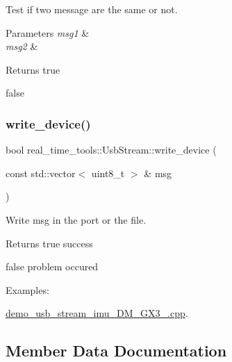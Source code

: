 Test if two message are the same or not. 


\begin{DoxyParams}{Parameters}
{\em msg1} & \\
\hline
{\em msg2} & \\
\hline
\end{DoxyParams}
\begin{DoxyReturn}{Returns}
true 

false 
\end{DoxyReturn}
\mbox{\label{classreal__time__tools_1_1UsbStream_aa9fdd0d43fbf0cddbffb65538af60321}} 
\subsubsection{\texorpdfstring{write\+\_\+device()}{write\_device()}}
{\footnotesize\ttfamily bool real\+\_\+time\+\_\+tools\+::\+Usb\+Stream\+::write\+\_\+device (\begin{DoxyParamCaption}\item[{const std\+::vector$<$ uint8\+\_\+t $>$ \&}]{msg }\end{DoxyParamCaption})}



Write msg in the port or the file. 

\begin{DoxyReturn}{Returns}
true success 

false problem occured 
\end{DoxyReturn}
\begin{Desc}
\item[Examples\+: ]\par
\hyperlink{demo_usb_stream_imu_3DM_GX3_25_8cpp-example}{demo\+\_\+usb\+\_\+stream\+\_\+imu\+\_\+D\+M\+\_\+\+G\+X3\+\_.\+cpp}.\end{Desc}


\subsection{Member Data Documentation}
\mbox{\label{classreal__time__tools_1_1UsbStream_ac8d1e2727668e9549dda2038248943d5}} 
